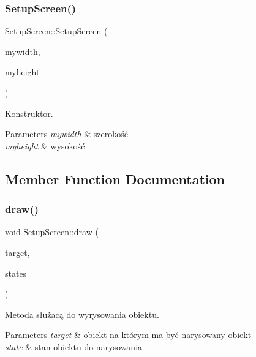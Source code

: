 \subsubsection{\texorpdfstring{SetupScreen()}{SetupScreen()}}
{\footnotesize\ttfamily Setup\+Screen\+::\+Setup\+Screen (\begin{DoxyParamCaption}\item[{double}]{mywidth,  }\item[{double}]{myheight }\end{DoxyParamCaption})\hspace{0.3cm}{\ttfamily [private]}}



Konstruktor. 


\begin{DoxyParams}{Parameters}
{\em mywidth} & szerokość \\
\hline
{\em myheight} & wysokość \\
\hline
\end{DoxyParams}


\subsection{Member Function Documentation}
\mbox{\label{class_setup_screen_a64ca86c7735fa3fc900cc0d5466c2d53}} 
\subsubsection{\texorpdfstring{draw()}{draw()}}
{\footnotesize\ttfamily void Setup\+Screen\+::draw (\begin{DoxyParamCaption}\item[{Render\+Target \&}]{target,  }\item[{Render\+States}]{states }\end{DoxyParamCaption})\hspace{0.3cm}{\ttfamily [virtual]}}



Metoda służacą do wyrysowania obiektu. 


\begin{DoxyParams}{Parameters}
{\em target} & obiekt na którym ma być narysowany obiekt \\
\hline
{\em state} & stan obiektu do narysowania \\
\hline
\end{DoxyParams}


